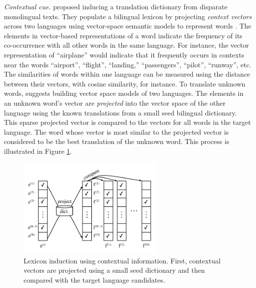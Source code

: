 \documentclass{article}
\begin{document}
\noindent\emph{Contextual cue.} \cite{Rapp:1999} proposed inducing a translation dictionary from disparate monolingual texts.  They populate a bilingual lexicon by projecting {\it context vectors} across two languages using vector-space semantic models to represent words  \cite{Deerwester:1990}.  The elements in vector-based representations of a word indicate the frequency of its co-occurrence with all other words in the same language.  For instance, the vector representation of ``airplane'' would indicate that it frequently occurs in contexts near the words ``airport'', ``flight'', ``landing,'' ``passengers'', ``pilot'', ``runway'',  etc.  The similarities of words within one language can be measured using the distance between their vectors, with cosine similarity, for instance.  To translate unknown words, \cite{Rapp:1999} suggests building vector space models of two languages.  The elements in an unknown word's vector are {\it projected} into the vector space of the other language using the known translations from a small seed bilingual dictionary.  This sparse projected vector is compared to the vectors for all words in the target language.  The word whose vector is most similar to the projected vector is considered to be the best translation of the unknown word.  This process is illustrated in Figure \ref{fig:contextual}.\\

\begin{figure}
\centerline{\mbox{\includegraphics[width=2.8in]{figures/contextual}}}
\caption{Lexicon induction using contextual information. First, contextual vectors are projected using a small seed dictionary and then compared with the target language candidates.}
\label{fig:contextual}
\end{figure}
\end{document}
